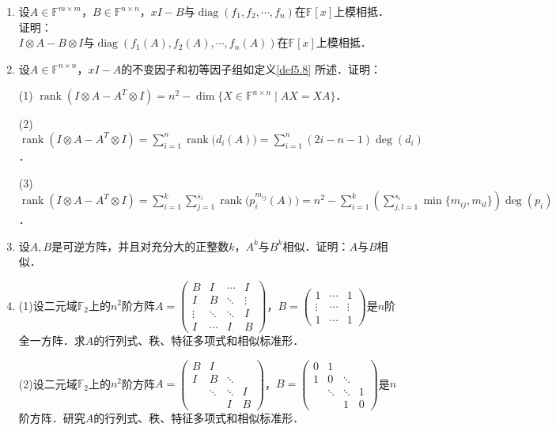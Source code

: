 \documentclass[a4paper,fontset=windows]{ctexbook}
\theoremstyle{definition}
\DeclareMathOperator{\diag}{diag}
\DeclareMathOperator{\rank}{rank}
\begin{document}
\begin{enumerate}
\item 设$A\in\mathbb{F}^{m\times m}$，$B\in\mathbb{F}^{n\times n}$，$xI-B$与$\diag(f_1,f_2,\cdots,f_n)$在$\mathbb{F}[x]$上模相抵．证明：\\
$I\otimes A-B\otimes I$与$\diag(f_1(A),f_2(A),\cdots,f_n(A))$在$\mathbb{F}[x]$上模相抵．

\item 设$A\in\mathbb{F}^{n\times n}$，$xI-A$的不变因子和初等因子组如定义\ref{def5.8} 所述．证明：

(1) $\displaystyle\rank(I\otimes A-A^T\otimes I)=n^2-\dim\{X\in\mathbb{F}^{n\times n}\mid AX=XA\}$．

(2) $\displaystyle\rank(I\otimes A-A^T\otimes I)=\sum_{i=1}^n\rank\bigl(d_i(A)\bigr)=\sum_{i=1}^n(2i-n-1)\deg(d_i)$．

(3) $\displaystyle\rank(I\otimes A-A^T\otimes I)=\sum_{i=1}^k\sum_{j=1}^{s_i}\rank\bigl(p_i^{m_{ij}}(A)\bigr)=n^2-\sum_{i=1}^k\left(\sum_{j,l=1}^{s_i}\min\{m_{ij},m_{il}\}\right)\deg(p_i)$．

\item 设$A,B$是可逆方阵，并且对充分大的正整数$k$，$A^k$与$B^k$相似．证明：$A$与$B$相似．

\item (1)设二元域$\mathbb{F}_2$上的$n^2$阶方阵$A=\begin{pmatrix}B&I&\cdots&I \\ I&B&\ddots&\vdots \\ \vdots&\ddots&\ddots&I \\ I&\cdots&I&B\end{pmatrix}$，$B=\begin{pmatrix}1&\cdots&1 \\ \vdots&\cdots&\vdots \\ 1&\cdots&1\end{pmatrix}$是$n$阶全一方阵．求$A$的行列式、秩、特征多项式和相似标准形．

(2)设二元域$\mathbb{F}_2$上的$n^2$阶方阵$A=\begin{pmatrix}B&I&& \\ I&B&\ddots& \\ &\ddots&\ddots&I \\ &&I&B\end{pmatrix}$，$B=\begin{pmatrix}0&1&& \\ 1&0&\ddots& \\ &\ddots&\ddots&1 \\ &&1&0\end{pmatrix}$是$n$阶方阵．研究$A$的行列式、秩、特征多项式和相似标准形．

\end{enumerate}
\end{document}
